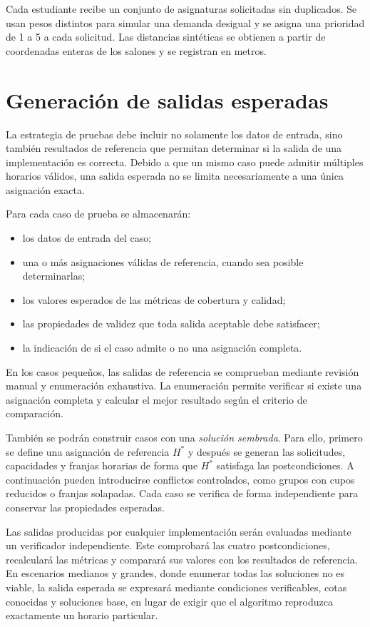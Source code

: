 \documentclass[11pt]{article}
\numberwithin{equation}{section}
\numberwithin{figure}{section}
\numberwithin{table}{section}
\theoremstyle{definition}
\begin{document}
Cada estudiante recibe un conjunto de asignaturas solicitadas sin
duplicados. Se usan pesos distintos para simular una demanda desigual
y se asigna una prioridad de 1 a 5 a cada solicitud. Las distancias
sintéticas se obtienen a partir de coordenadas enteras de los salones
y se registran en metros.

\section{Generación de salidas esperadas}

La estrategia de pruebas debe incluir no solamente los datos de entrada, sino
también resultados de referencia que permitan determinar si la salida de una
implementación es correcta. Debido a que un mismo caso puede admitir múltiples
horarios válidos, una salida esperada no se limita necesariamente a una única
asignación exacta.

Para cada caso de prueba se almacenarán:

\begin{itemize}
  \item los datos de entrada del caso;
  \item una o más asignaciones válidas de referencia, cuando sea posible
        determinarlas;
  \item los valores esperados de las métricas de cobertura y calidad;
  \item las propiedades de validez que toda salida aceptable debe satisfacer;
  \item la indicación de si el caso admite o no una asignación completa.
\end{itemize}

En los casos pequeños, las salidas de referencia se comprueban mediante
revisión manual y enumeración exhaustiva. La enumeración permite verificar
si existe una asignación completa y calcular el mejor resultado según el
criterio de comparación.

También se podrán construir casos con una \emph{solución sembrada}. Para ello,
primero se define una asignación de referencia $H^{*}$ y después se generan las
solicitudes, capacidades y franjas horarias de forma que $H^{*}$ satisfaga las
postcondiciones. A continuación pueden introducirse conflictos controlados,
como grupos con cupos reducidos o franjas solapadas. Cada caso se verifica
de forma independiente para conservar las propiedades esperadas.

Las salidas producidas por cualquier implementación serán evaluadas mediante
un verificador independiente. Este comprobará las cuatro postcondiciones,
recalculará las métricas y comparará sus valores con los resultados de
referencia. En escenarios medianos y grandes, donde enumerar todas las
soluciones no es viable, la salida esperada se expresará mediante condiciones
verificables, cotas conocidas y soluciones base, en lugar de exigir que el
algoritmo reproduzca exactamente un horario particular.
\end{document}
